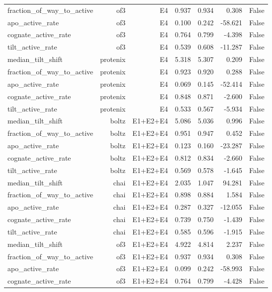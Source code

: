 \begin{table}[htbp]
\begin{tabular}{lrrrrrr}
fraction\_of\_way\_to\_active & of3 & E4 & 0.937 & 0.934 & 0.308 & False \\
apo\_active\_rate & of3 & E4 & 0.100 & 0.242 & -58.621 & False \\
cognate\_active\_rate & of3 & E4 & 0.764 & 0.799 & -4.398 & False \\
tilt\_active\_rate & of3 & E4 & 0.539 & 0.608 & -11.287 & False \\
median\_tilt\_shift & protenix & E4 & 5.318 & 5.307 & 0.209 & False \\
fraction\_of\_way\_to\_active & protenix & E4 & 0.923 & 0.920 & 0.288 & False \\
apo\_active\_rate & protenix & E4 & 0.069 & 0.145 & -52.414 & False \\
cognate\_active\_rate & protenix & E4 & 0.848 & 0.871 & -2.600 & False \\
tilt\_active\_rate & protenix & E4 & 0.533 & 0.567 & -5.934 & False \\
median\_tilt\_shift & boltz & E1+E2+E4 & 5.086 & 5.036 & 0.996 & False \\
fraction\_of\_way\_to\_active & boltz & E1+E2+E4 & 0.951 & 0.947 & 0.452 & False \\
apo\_active\_rate & boltz & E1+E2+E4 & 0.123 & 0.160 & -23.287 & False \\
cognate\_active\_rate & boltz & E1+E2+E4 & 0.812 & 0.834 & -2.660 & False \\
tilt\_active\_rate & boltz & E1+E2+E4 & 0.569 & 0.578 & -1.645 & False \\
median\_tilt\_shift & chai & E1+E2+E4 & 2.035 & 1.047 & 94.281 & False \\
fraction\_of\_way\_to\_active & chai & E1+E2+E4 & 0.898 & 0.884 & 1.584 & False \\
apo\_active\_rate & chai & E1+E2+E4 & 0.287 & 0.327 & -12.055 & False \\
cognate\_active\_rate & chai & E1+E2+E4 & 0.739 & 0.750 & -1.439 & False \\
tilt\_active\_rate & chai & E1+E2+E4 & 0.585 & 0.596 & -1.915 & False \\
median\_tilt\_shift & of3 & E1+E2+E4 & 4.922 & 4.814 & 2.237 & False \\
fraction\_of\_way\_to\_active & of3 & E1+E2+E4 & 0.937 & 0.934 & 0.308 & False \\
apo\_active\_rate & of3 & E1+E2+E4 & 0.099 & 0.242 & -58.993 & False \\
cognate\_active\_rate & of3 & E1+E2+E4 & 0.764 & 0.799 & -4.428 & False \\

\end{tabular}
\end{table}
